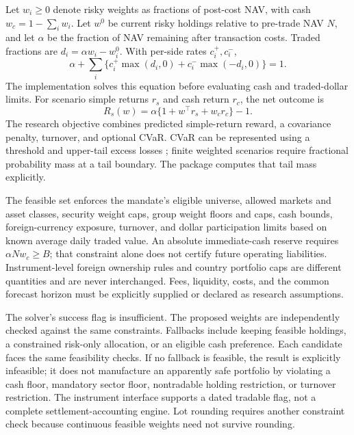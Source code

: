 \documentclass[11pt,a4paper]{article}
\begin{document}
Let $w_i\ge0$ denote risky weights as fractions of post-cost NAV, with cash $w_c=1-\sum_iw_i$. Let $w^0$ be current risky holdings relative to pre-trade NAV $N$, and let $\alpha$ be the fraction of NAV remaining after transaction costs. Traded fractions are $d_i=\alpha w_i-w_i^0$. With per-side rates $c_i^+,c_i^-$,
\begin{equation}
\alpha+\sum_i\{c_i^+\max(d_i,0)+c_i^-\max(-d_i,0)\}=1.
\end{equation}
The implementation solves this equation before evaluating cash and traded-dollar limits. For scenario simple returns $r_s$ and cash return $r_c$, the net outcome is
\begin{equation}
R_s(w)=\alpha\{1+w^\top r_s+w_cr_c\}-1.
\end{equation}
The research objective combines predicted simple-return reward, a covariance penalty, turnover, and optional CVaR. CVaR can be represented using a threshold and upper-tail excess losses \citep{rockafellar2000}; finite weighted scenarios require fractional probability mass at a tail boundary. The package computes that tail mass explicitly.

The feasible set enforces the mandate's eligible universe, allowed markets and asset classes, security weight caps, group weight floors and caps, cash bounds, foreign-currency exposure, turnover, and dollar participation limits based on known average daily traded value. An absolute immediate-cash reserve requires $\alpha Nw_c\ge B$; that constraint alone does not certify future operating liabilities. Instrument-level foreign ownership rules and country portfolio caps are different quantities and are never interchanged. Fees, liquidity, costs, and the common forecast horizon must be explicitly supplied or declared as research assumptions.

The solver's success flag is insufficient. The proposed weights are independently checked against the same constraints. Fallbacks include keeping feasible holdings, a constrained risk-only allocation, or an eligible cash preference. Each candidate faces the same feasibility checks. If no fallback is feasible, the result is explicitly infeasible; it does not manufacture an apparently safe portfolio by violating a cash floor, mandatory sector floor, nontradable holding restriction, or turnover restriction. The instrument interface supports a dated tradable flag, not a complete settlement-accounting engine. Lot rounding requires another constraint check because continuous feasible weights need not survive rounding.
\end{document}
